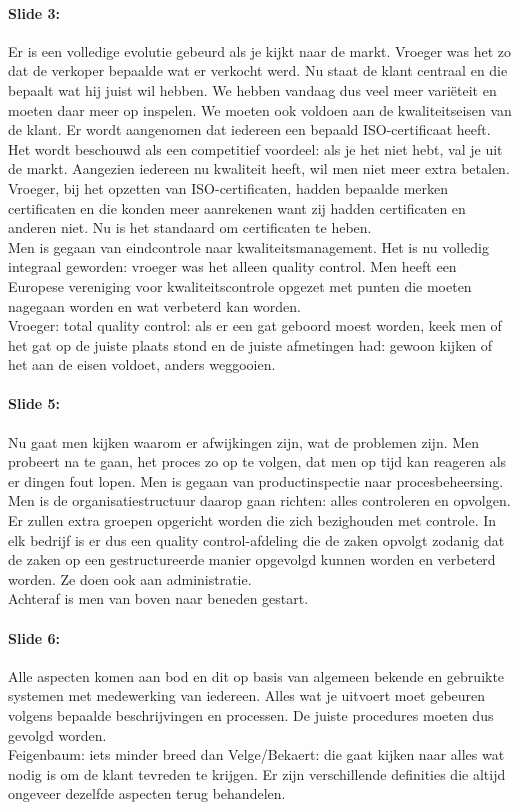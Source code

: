 \documentclass[10pt,a4paper]{report}
\begin{document}
\paragraph{Slide 3:} Er is een volledige evolutie gebeurd als je kijkt naar de markt. Vroeger was het zo dat de verkoper bepaalde wat er verkocht werd. Nu staat de klant centraal en die bepaalt wat hij juist wil hebben. We hebben vandaag dus veel meer vari\"eteit en moeten daar meer op inspelen. We moeten ook voldoen aan de kwaliteitseisen van de klant. Er wordt aangenomen dat iedereen een bepaald ISO-certificaat heeft. Het wordt beschouwd als een competitief voordeel: als je het niet hebt, val je uit de markt. Aangezien iedereen nu kwaliteit heeft, wil men niet meer extra betalen. Vroeger, bij het opzetten van ISO-certificaten, hadden bepaalde merken certificaten en die konden meer aanrekenen want zij hadden certificaten en anderen niet. Nu is het standaard om certificaten te heben. \\
Men is gegaan van eindcontrole naar kwaliteitsmanagement. Het is nu volledig integraal geworden: vroeger was het alleen quality control. Men heeft een Europese vereniging voor kwaliteitscontrole opgezet met punten die moeten nagegaan worden en wat verbeterd kan worden.\\
Vroeger: total quality control: als er een gat geboord moest worden, keek men of het gat op de juiste plaats stond en de juiste afmetingen had: gewoon kijken of het aan de eisen voldoet, anders weggooien.

\paragraph{Slide 5:} Nu gaat men kijken waarom er afwijkingen zijn, wat de problemen zijn. Men probeert na te gaan, het proces zo op te volgen, dat men op tijd kan reageren als er dingen fout lopen. Men is gegaan van productinspectie naar procesbeheersing. \\
Men is de organisatiestructuur daarop gaan richten: alles controleren en opvolgen. Er zullen extra groepen opgericht worden die zich bezighouden met controle. In elk bedrijf is er dus een quality control-afdeling die de zaken opvolgt zodanig dat de zaken op een gestructureerde manier opgevolgd kunnen worden en verbeterd worden. Ze doen ook aan administratie. \\
Achteraf is men van boven naar beneden gestart.

\paragraph{Slide 6:} Alle aspecten komen aan bod en dit op basis van algemeen bekende en gebruikte systemen met medewerking van iedereen. Alles wat je uitvoert moet gebeuren volgens bepaalde beschrijvingen en processen. De juiste procedures moeten dus gevolgd worden.\\
Feigenbaum: iets minder breed dan Velge/Bekaert: die gaat kijken naar alles wat nodig is om de klant tevreden te krijgen. Er zijn verschillende definities die altijd ongeveer dezelfde aspecten terug behandelen.
\end{document}
